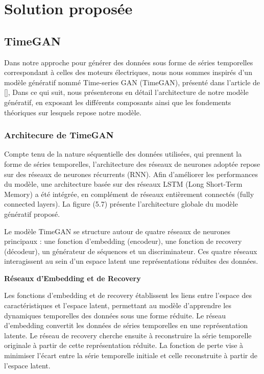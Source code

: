 \section{Solution proposée}

\subsection{TimeGAN}

Dans notre approche pour générer des données sous forme de séries temporelles
correspondant à celles des moteurs électriques, nous nous sommes inspirés d'un
modèle génératif nommé Time-series GAN (TimeGAN), présenté dans l'article de
  [\cite{yoon2019time}], Dans ce qui suit, nous présenterons en détail
l'architecture de notre modèle génératif, en exposant les différents composants
ainsi que les fondements théoriques sur lesquels repose notre modèle.

\subsubsection{Architecure de TimeGAN}

Compte tenu de la nature séquentielle des données utilisées, qui prennent la
forme de séries temporelles, l'architecture des réseaux de neurones adoptée
repose sur des réseaux de neurones récurrents (RNN). Afin d'améliorer les
performances du modèle, une architecture basée sur des réseaux LSTM (Long
Short-Term Memory) a été intégrée, en complément de réseaux entièrement
connectés (fully connected layers). La figure (5.7) présente l'architecture
globale du modèle génératif proposé.

Le modèle TimeGAN se structure autour de quatre réseaux de neurones principaux
: une fonction d'embedding (encodeur), une fonction de recovery (décodeur), un
générateur de séquences et un discriminateur. Ces quatre réseaux interagissent
au sein d'un espace latent une représentations réduites des données.

\textbf{Réseaux d'Embedding et de Recovery}

Les fonctions d'embedding et de recovery établissent les liens entre l'espace
des caractéristiques et l'espace latent, permettant au modèle d'apprendre les
dynamiques temporelles des données sous une forme réduite. Le réseau
d'embedding convertit les données de séries temporelles en une représentation
latente. Le réseau de recovery cherche ensuite à reconstruire la série
temporelle originale à partir de cette représentation réduite. La fonction de
perte vise à minimiser l'écart entre la série temporelle initiale et celle
reconstruite à partir de l'espace latent.

